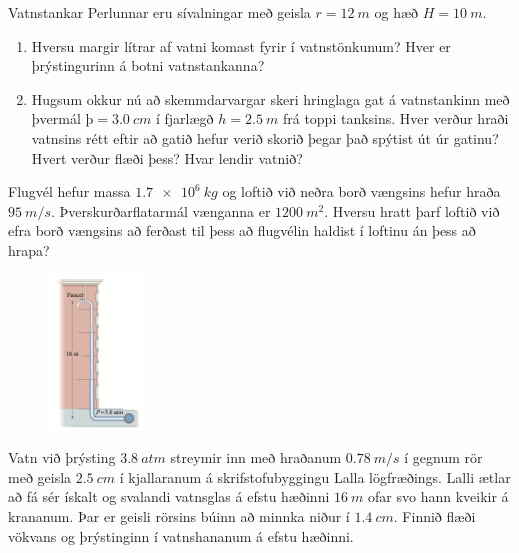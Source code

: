 \begin{enumerate}[label = \textbf{Dæmi \thechapter.\arabic*.}]
\begin{minipage}{\linewidth}
\item Vatnstankar Perlunnar eru sívalningar með geisla $r = \SI{12}{m}$ og hæð $H = \SI{10}{m}$. 
\begin{enumerate}[label = \textbf{(\alph*)}]
    \item Hversu margir lítrar af vatni komast fyrir í vatnstönkunum? Hver er þrýstingurinn á botni vatnstankanna?
    \item Hugsum okkur nú að skemmdarvargar skeri hringlaga gat á vatnstankinn með þvermál $\text{þ} = \SI{3.0}{cm}$ í fjarlægð $h = \SI{2.5}{m}$ frá toppi tanksins. Hver verður hraði vatnsins rétt eftir að gatið hefur verið skorið þegar það spýtist út úr gatinu? Hvert verður flæði þess?  Hvar lendir vatnið?
\end{enumerate}
\end{minipage}

\item Flugvél hefur massa $\SI{1.7e6}{kg}$ og loftið við neðra borð vængsins hefur hraða $\SI{95}{m/s}$. Þverskurðarflatarmál vænganna er $\SI{1200}{m^2}$. Hversu hratt þarf loftið við efra borð vængsins að ferðast til þess að flugvélin haldist í loftinu án þess að hrapa?

\begin{minipage}{\linewidth}
\begin{figure}
\vspace{-0.5cm}
\hspace{0.5cm}
\includegraphics[width = 1in]{images/building.png}
\end{figure}

\item Vatn við þrýsting $\SI{3.8}{atm}$ streymir inn með hraðanum $\SI{0.78}{m/s}$ í gegnum rör með geisla $\SI{2.5}{cm}$ í kjallaranum á skrifstofubyggingu Lalla lögfræðings. Lalli ætlar að fá sér ískalt og svalandi vatnsglas á efstu hæðinni $\SI{16}{m}$ ofar svo hann kveikir á krananum. Þar er geisli rörsins búinn að minnka niður í $\SI{1.4}{cm}$. Finnið flæði vökvans og þrýstinginn í vatnshananum á efstu hæðinni.

\end{minipage}


\end{enumerate}

